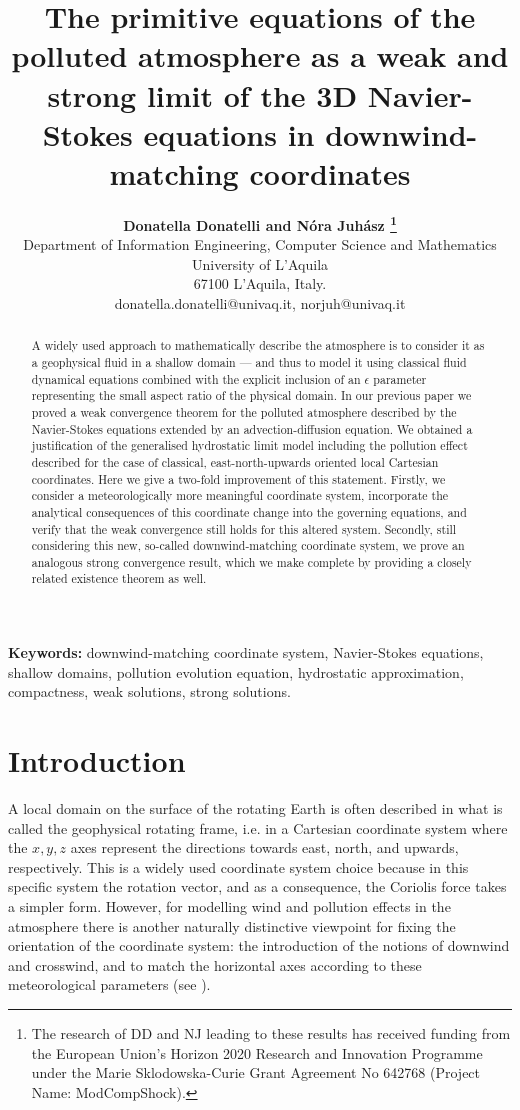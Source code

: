 \documentclass[11pt]{article}
\title{The primitive equations of the polluted atmosphere as a weak and strong limit of the 3D Navier-Stokes equations in downwind-matching coordinates}
\author{
\large{\bf{Donatella Donatelli} and \bf{N\'ora Juh\'asz}
\thanks{The research of DD and NJ leading to these results has received funding from the European Union's Horizon 2020 Research and Innovation Programme under the Marie Sklodowska-Curie Grant Agreement No 642768 (Project Name: ModCompShock).}} \\[1ex]
\normalsize Department of Information Engineering, Computer Science and Mathematics \\
\normalsize University of L'Aquila \\
\normalsize 67100 L'Aquila, Italy. \\
\normalsize {donatella.donatelli@univaq.it}, {norjuh@univaq.it}
}
\date{}
\begin{document}
\maketitle

\begin{abstract}

A widely used approach to mathematically describe the atmosphere is to consider it as a geophysical fluid in a shallow domain --- and thus to model it using classical fluid dynamical equations combined with the explicit inclusion of an $\epsilon$ parameter representing the small aspect ratio of the physical domain. In our previous paper \cite{pollatmws2019} we proved a weak convergence theorem for the polluted atmosphere described by the Navier-Stokes equations extended by an advection-diffusion equation. We obtained a justification of the generalised hydrostatic limit model including the pollution effect described for the case of classical, east-north-upwards oriented local Cartesian coordinates. Here we give a two-fold improvement of this statement. Firstly, we consider a meteorologically more meaningful coordinate system, incorporate the analytical consequences of this coordinate change into the governing equations, and verify that the weak convergence still holds for this altered system. Secondly, still considering this new, so-called downwind-matching coordinate system, we prove an analogous strong convergence result, which we make complete by providing a closely related existence theorem as well.

\end{abstract}

{\bf Keywords:} downwind-matching coordinate system, Navier-Stokes equations, shallow domains, pollution evolution equation, hydrostatic approximation, compactness, weak solutions, strong solutions.

\newpage

\tableofcontents
\newpage

\section{Introduction} \label{Introduction}

A local domain on the surface of the rotating Earth is often described in what is called the geophysical rotating frame, i.e. in a Cartesian coordinate system where the $x, y, z$ axes represent the directions towards east, north, and upwards, respectively. This is a widely used coordinate system choice because in this specific system the rotation vector, and as a consequence, the Coriolis force takes a simpler form. However, for modelling wind and pollution effects in the atmosphere there is another naturally distinctive viewpoint for fixing the orientation of the coordinate system: the introduction of the notions of downwind and crosswind, and to match the horizontal axes according to these meteorological parameters (see \cite{goyal2011mathematical}).
\end{document}
